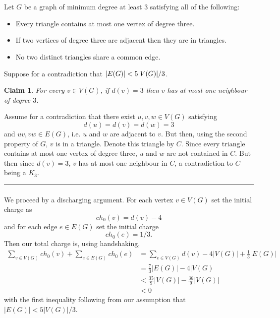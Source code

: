 \documentclass[letterpaper,12pt,oneside,onecolumn]{article}
\newenvironment{proof}{{\bf Proof:  }}{\hfill\rule{2mm}{2mm}}
\newtheorem{claim}[fact]{Claim}
\DeclarePairedDelimiter\abs{\lvert}{\rvert}%
\begin{document}
\section{}
\paragraph{}
Let $G$ be a graph of minimum degree at least $3$ satisfying all of the following:
\begin{itemize}
	\item Every triangle contains at most one vertex of degree three.
	\item If two vertices of degree three are adjacent then they are in triangles.
	\item No two distinct triangles share a common edge.
\end{itemize}
Suppose for a contradiction that $\abs{E(G)} < 5\abs{V(G)}/3$.
\begin{claim}\label{1.1}
	For every $v \in V(G)$, if $d(v) = 3$ then $v$ has at most one neighbour of degree $3$.
\end{claim}
\begin{proof}
	Assume for a contradiction that there exist $u,v, w \in V(G)$ satisfying
	$$d(u) = d(v) = d(w) = 3$$
	and $uv, vw \in E(G)$, i.e. $u$ and $w$ are adjacent to $v$. But then, using the second property of $G$, $v$ is in a triangle. Denote this triangle by $C$. Since every triangle contains at most one vertex of degree three, $u$ and $w$ are not contained in $C$. But then since $d(v) = 3$, $v$ has at most one neighbour in $C$, a contradiction to $C$ being a $K_3$.
\end{proof}
\paragraph{}
We proceed by a discharging argument. For each vertex $v \in V(G)$ set the initial charge as
$$ch_0(v) = d(v) - 4$$
and for each edge $e \in E(G)$ set the initial charge
$$ch_0(e) = 1/3.$$
Then our total charge is, using handshaking,
\begin{align*}
\sum_{v\in V(G)} ch_0(v) + \sum_{e \in E(G)} ch_0(e) &= \sum_{v \in V(G)} d(v) - 4|V(G)| + \frac{1}{3} |E(G)|\\ &=  \frac{7}{3}|E(G)| - 4|V(G)\\ &< \frac{35}{9}|V(G)| - \frac{36}{9}|V(G)|\\ &< 0
\end{align*}
with the first inequality following from our assumption that $|E(G)| < 5|V(G)|/3$.
\end{document}
